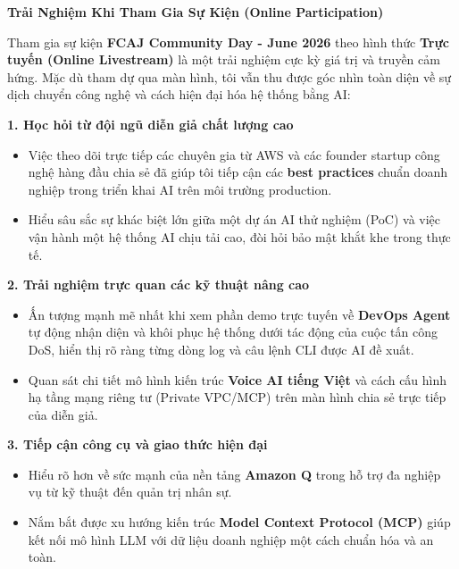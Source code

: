 \vspace{0.5em}\noindent\textbf{Trải Nghiệm Khi Tham Gia Sự Kiện (Online Participation)}

Tham gia sự kiện \textbf{FCAJ Community Day - June 2026} theo hình thức
\textbf{Trực tuyến (Online Livestream)} là một trải nghiệm cực kỳ giá
trị và truyền cảm hứng. Mặc dù tham dự qua màn hình, tôi vẫn thu được
góc nhìn toàn diện về sự dịch chuyển công nghệ và cách hiện đại hóa hệ
thống bằng AI:

\vspace{0.5em}\noindent\textbf{1. Học hỏi từ đội ngũ diễn giả chất lượng cao}

\begin{itemize}
\tightlist
\item
  Việc theo dõi trực tiếp các chuyên gia từ AWS và các founder startup
  công nghệ hàng đầu chia sẻ đã giúp tôi tiếp cận các \textbf{best
  practices} chuẩn doanh nghiệp trong triển khai AI trên môi trường
  production.
\item
  Hiểu sâu sắc sự khác biệt lớn giữa một dự án AI thử nghiệm (PoC) và
  việc vận hành một hệ thống AI chịu tải cao, đòi hỏi bảo mật khắt khe
  trong thực tế.
\end{itemize}

\vspace{0.5em}\noindent\textbf{2. Trải nghiệm trực quan các kỹ thuật nâng cao}

\begin{itemize}
\tightlist
\item
  Ấn tượng mạnh mẽ nhất khi xem phần demo trực tuyến về \textbf{DevOps
  Agent} tự động nhận diện và khôi phục hệ thống dưới tác động của cuộc
  tấn công DoS, hiển thị rõ ràng từng dòng log và câu lệnh CLI được AI
  đề xuất.
\item
  Quan sát chi tiết mô hình kiến trúc \textbf{Voice AI tiếng Việt} và
  cách cấu hình hạ tầng mạng riêng tư (Private VPC/MCP) trên màn hình
  chia sẻ trực tiếp của diễn giả.
\end{itemize}

\vspace{0.5em}\noindent\textbf{3. Tiếp cận công cụ và giao thức hiện đại}

\begin{itemize}
\tightlist
\item
  Hiểu rõ hơn về sức mạnh của nền tảng \textbf{Amazon Q} trong hỗ trợ đa
  nghiệp vụ từ kỹ thuật đến quản trị nhân sự.
\item
  Nắm bắt được xu hướng kiến trúc \textbf{Model Context Protocol (MCP)}
  giúp kết nối mô hình LLM với dữ liệu doanh nghiệp một cách chuẩn hóa
  và an toàn.
\end{itemize}

